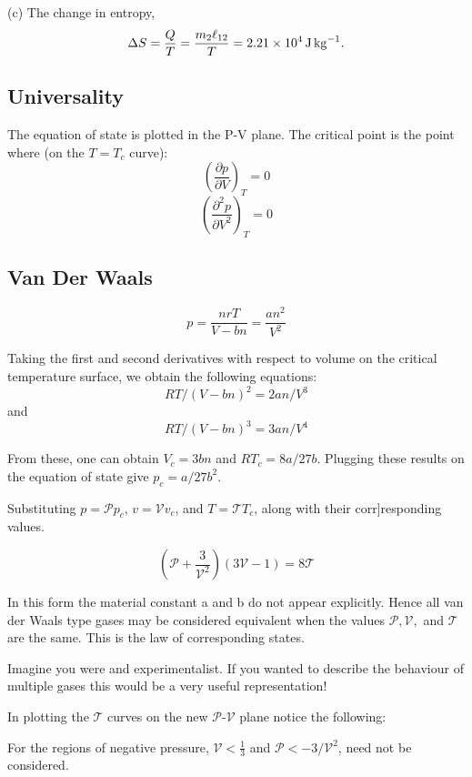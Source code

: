 \documentclass[10pt,twoside,openright]{memoir}
\begin{document}
(c) The change in entropy, \\
\begin{equation}
\Delta S = \frac{Q}{T} = \frac{m_{2} \ell _{12}}{T}\\
= 2.21 \times 10^{4} \, \si{\joule\per\kilogram}.
\end{equation}


\subsection{\label{sec:level1}Universality}

The equation of state is plotted in the P-V plane.
The critical point is the point where (on the $T=T_c$ curve):
$$
\left( \frac{\partial p}{\partial V} \right)_{T} =0
$$
$$
\left( \frac{\partial^2 p}{\partial V^2} \right)_{T} =0
$$
\subsection{\label{sec:level2} Van Der Waals}
$$
p = \frac{nrT}{V-bn} = \frac{an^2}{V^2}
$$

Taking the first and second derivatives with respect to volume on the critical temperature surface, we obtain the following equations:
$$
RT/(V-bn)^2 = 2an/V^3
$$
and
$$
RT/(V-bn)^3 = 3an/V^4
$$

From these, one can obtain $V_c=3bn$ and $RT_c=8a/27b$. Plugging these results on the equation of state give $p_c = a/27b^2$.

Substituting $p = \mathcal{P} p_c$, $v = \mathcal{V} v_c$, and $T= \mathcal{T} T_c$, along with their corr]responding values.

$$
\left( \mathcal{P} + \frac{3}{\mathcal{V}^2}\right) \left( 3\mathcal{V} - 1 \right) = 8\mathcal{T}
$$

In this form the material constant a and b do not appear explicitly. Hence all van der Waals type gases may be considered equivalent when the values $\mathcal{P}, \mathcal{V},$ and $\mathcal{T}$ are the same. This is the law of corresponding states.

Imagine you were and experimentalist. If you wanted to describe the behaviour of multiple gases this would be a very useful representation!

In plotting the $\mathcal{T}$ curves on the new $\mathcal{P}$-$\mathcal{V}$ plane notice the following:

For the regions of negative pressure, $\mathcal{V}<\frac{1}{3}$ and $\mathcal{P} < -3/\mathcal{V}^2$, need not be considered.
\end{document}

